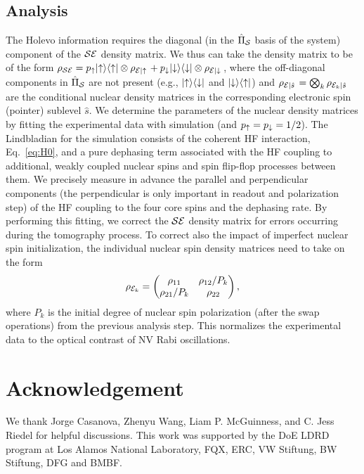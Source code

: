 \documentclass[aps,prl,floatfix,twocolumn,footinbib,superscriptaddress]{revtex4-1}
\begin{document}
\subsection*{\label{sec:analysis}Analysis}

The Holevo information requires the diagonal (in the $\hat{\Pi}_{\mathcal{S}}$ basis of the system) component of the $\mathcal{S}\mathcal{E}$ density matrix. We thus can take the density matrix to be of the form $\rho_{\mathcal{S}\mathcal{E}}= p_{\mathord{\uparrow}} |\mathord{\uparrow}\rangle\langle\mathord{\uparrow}| \otimes \rho_{\mathcal{E}\left|\mathord{\uparrow}\right.} + p_{\mathord{\downarrow}} |\mathord{\downarrow}\rangle\langle\mathord{\downarrow}| \otimes \rho_{\mathcal{E}\left|\mathord{\downarrow}\right.}$, where the off-diagonal components in $\hat{\Pi}_{\mathcal{S}}$ are not present (e.g., $|\mathord{\uparrow}\rangle\langle\mathord{\downarrow}|$ and $|\mathord{\downarrow}\rangle\langle\mathord{\uparrow}|$) and $\rho_{\mathcal{E}\left|\hat{s}\right.}=\bigotimes_k \rho_{\mathcal{E}_k\left|\hat{s}\right.}$ are the conditional nuclear density matrices in the corresponding electronic spin (pointer) sublevel $\hat{s}$. We determine the parameters of the nuclear density matrices by fitting the experimental data with simulation (and $p_{\mathord{\uparrow}} = p_{\mathord{\downarrow}} = 1/2$). The Lindbladian for the simulation consists of the coherent HF interaction, Eq.~\eqref{eq:H0}, and a pure dephasing term associated with the HF coupling to additional, weakly coupled nuclear spins and spin flip-flop processes between them. We precisely measure in advance the parallel and perpendicular components (the perpendicular is only important in readout and polarization step) of the HF coupling to the four core spins and the dephasing rate. By performing this fitting, we correct the $\mathcal{S}\mathcal{E}$ density matrix for errors occurring during the tomography process. To correct also the impact of imperfect nuclear spin initialization, the individual nuclear spin density matrices need to take on the form 
\begin{equation}
\rho_{\mathcal{E}_k} = \begin{pmatrix}
\rho_{11} & \rho_{12}/P_k\\
\rho_{21}/P_k & \rho_{22}
\end{pmatrix} ,
\end{equation}
where $P_k$ is the initial degree of nuclear spin polarization (after the swap operations) from the previous analysis step. This normalizes the experimental data to the optical contrast of NV Rabi oscillations. 

\section*{\label{sec:Acknowledgement} Acknowledgement}
We thank Jorge Casanova, Zhenyu Wang, Liam P. McGuinness, and C. Jess Riedel for helpful discussions. This work was supported by the DoE LDRD program at Los Alamos National Laboratory, FQX, ERC, VW Stiftung,  BW Stiftung, DFG and BMBF.



\end{document}
